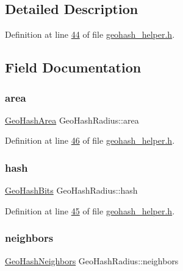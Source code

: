 \subsection{Detailed Description}


Definition at line \hyperlink{geohash__helper_8h_source_l00044}{44} of file \hyperlink{geohash__helper_8h_source}{geohash\+\_\+helper.\+h}.



\subsection{Field Documentation}
\mbox{\label{structGeoHashRadius_a1df5fd77037c3aa4273769fb2e85c542}} 
\subsubsection{\texorpdfstring{area}{area}}
{\footnotesize\ttfamily \hyperlink{structGeoHashArea}{Geo\+Hash\+Area} Geo\+Hash\+Radius\+::area}



Definition at line \hyperlink{geohash__helper_8h_source_l00046}{46} of file \hyperlink{geohash__helper_8h_source}{geohash\+\_\+helper.\+h}.

\mbox{\label{structGeoHashRadius_aa78f47b3fcc9be6d39f10f3e2733b724}} 
\subsubsection{\texorpdfstring{hash}{hash}}
{\footnotesize\ttfamily \hyperlink{structGeoHashBits}{Geo\+Hash\+Bits} Geo\+Hash\+Radius\+::hash}



Definition at line \hyperlink{geohash__helper_8h_source_l00045}{45} of file \hyperlink{geohash__helper_8h_source}{geohash\+\_\+helper.\+h}.

\mbox{\label{structGeoHashRadius_a5ea82458e6805a39b459ba018b8dc0f1}} 
\subsubsection{\texorpdfstring{neighbors}{neighbors}}
{\footnotesize\ttfamily \hyperlink{structGeoHashNeighbors}{Geo\+Hash\+Neighbors} Geo\+Hash\+Radius\+::neighbors}



